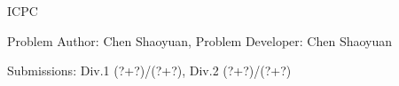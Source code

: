 \begin{Solution}{ICPC}

\begin{frame}{\ProblemName}

\small Problem Author: Chen Shaoyuan, Problem Developer: Chen Shaoyuan \par \vspace{0.3cm}

\small Submissions: Div.1 (?+?)/(?+?), Div.2 (?+?)/(?+?)  \par \vspace{0.5cm}


\end{frame}

\end{Solution}

